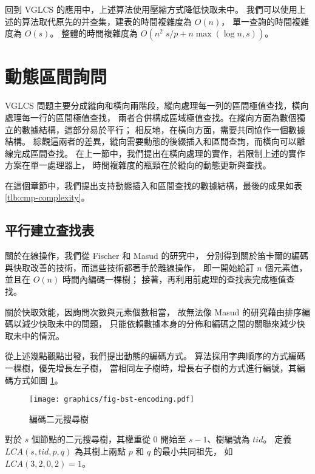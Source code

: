 



回到 VGLCS 的應用中，上述算法使用壓縮方式降低快取未中。
我們可以使用上述的算法取代原先的并查集，建表的時間複雜度為 $O(n)$，
單一查詢的時間複雜度為 $O(s)$。
整體的時間複雜度為 $O(n^2 \; s / p + n \max(\log n, s))$。

\section{動態區間詢問}

VGLCS 問題主要分成縱向和橫向兩階段，縱向處理每一列的區間極值查找，橫向處理每一行的區間極值查找，
兩者合併構成區域極值查找。在縱向方面為數個獨立的數據結構，這部分易於平行；
相反地，在橫向方面，需要共同協作一個數據結構。
綜觀這兩者的差異，縱向需要動態的後綴插入和區間查詢，而橫向可以離線完成區間查找。
在上一節中，我們提出在橫向處理的實作，若限制上述的實作方案在單一處理器上，
時間複雜度的瓶頸在於縱向的動態更新與查找。

在這個章節中，我們提出支持動態插入和區間查找的數據結構，最後的成果如表 \ref{tlb:cmp-complexity}。



\subsection{平行建立查找表}

關於在線操作，我們從 Fischer \cite{fischer} 和 Masud \cite{masud} 的研究中，
分別得到關於笛卡爾的編碼與快取改善的技術，而這些技術都著手於離線操作，
即一開始給訂 $n$ 個元素值，並且在 $O(n)$ 時間內編碼一棵樹；
接著，再利用前處理的查找表完成極值查找。

關於快取效能，因詢問次數與元素個數相當，
故無法像 Masud \cite{masud} 的研究藉由排序編碼以減少快取未中的問題，
只能依賴數據本身的分佈和編碼之間的關聯來減少快取未中的情況。

從上述幾點觀點出發，我們提出動態的編碼方式。
算法採用字典順序的方式編碼一棵樹，優先增長左子樹，
當相同左子樹時，增長右子樹的方式進行編號，其編碼方式如圖 \ref{fig:lablingBST}。

\begin{figure}[!thb]
  \centering
  \texttt{[image: graphics/fig-bst-encoding.pdf]}
  \caption{編碼二元搜尋樹}
  \label{fig:lablingBST}
\end{figure}

對於 $s$ 個節點的二元搜尋樹，其權重從 $0$ 開始至 $s-1$、樹編號為 $\mathit{tid}$。
定義 $\mathit{LCA}(s, \mathit{tid}, p, q)$ 為其樹上兩點 $p$ 和 $q$ 的最小共同祖先，
如 $\mathit{LCA}(3, 2, 0, 2) = 1$。

